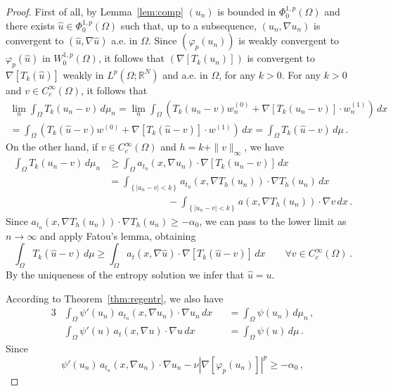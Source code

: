 \documentclass[twoside,reqno]{amsart}
\numberwithin{equation}{section}
\theoremstyle{definition}
\newcommand{\R}{\mathbb{R}}
\begin{document}
\begin{proof}
First of all, by Lemma~\ref{lem:comp} $(u_n)$ is
bounded in $\Phi^{1,p}_0(\Omega)$ and there exists 
$\hat{u}\in\Phi^{1,p}_0(\Omega)$ such that, 
up to a subsequence, $(u_n,\nabla u_n)$ is convergent to
$(\hat{u},\nabla\hat{u})$ a.e. in $\Omega$.
Since $(\varphi_p(u_n))$ is weakly convergent to
$\varphi_p(\hat{u})$ in $W^{1,p}_0(\Omega)$, it follows that
$(\nabla[T_k(u_n)])$ is convergent to $\nabla[T_k(\hat{u})]$ 
weakly in $L^p(\Omega;\R^N)$ and a.e. in $\Omega$, for any $k>0$.
For any $k>0$ and $v\in C^\infty_c(\Omega)$,  it follows that
\begin{multline*}
\lim_n \int_{\Omega} T_{k}(u_n-v) \,d\mu_n =
\lim_n \int_{\Omega} \left(T_{k}(u_n-v) w_n^{(0)}
+ \nabla [T_{k}(u_n-v)]\cdot w_n^{(1)}\right)\,dx \\
=
\int_{\Omega} \left(T_{k}(\hat{u}-v) w^{(0)}
+ \nabla [T_{k}(\hat{u}-v)]\cdot w^{(1)}\right)\,dx 
= \int_{\Omega} T_{k}(\hat{u}-v) \,d\mu\,.
\end{multline*}
On the other hand, if $v\in C^\infty_c(\Omega)$ 
and $h=k+\|v\|_\infty$, we have
\[
\begin{split}
\int_{\Omega} T_{k}(u_n-v)\,d\mu_n
&\geq
\int_{\Omega} a_{t_n}(x,\nabla u_n) \cdot 
\nabla \left[T_{k}(u_n-v)\right]\,dx\\
&=
\int_{\left\{|u_n-v|<k\right\}} 
a_{t_n}(x,\nabla T_h(u_n)) \cdot \nabla T_h(u_n)\,dx \\
&\qquad\qquad\qquad
- \int_{\left\{|u_n-v|<k\right\}} 
a(x,\nabla T_h(u_n)) \cdot \nabla v\,dx \,.
\end{split}
\]
Since 
$a_{t_n}(x,\nabla T_h(u_n)) \cdot \nabla T_h(u_n)
\geq -\alpha_0$, 
we can pass to the lower limit as $n\to\infty$ and
apply Fatou's lemma, obtaining
\[
\int_{\Omega} T_{k}(\hat{u}-v) \,d\mu
\geq
\int_{\Omega} a_{t}(x,\nabla \hat{u}) \cdot 
\nabla \left[T_{k}(\hat{u}-v)\right]\,dx
\qquad\forall v\in C^\infty_c(\Omega)\,.
\]
By the uniqueness of the entropy solution we infer
that $\hat{u}=u$.
\par
According to Theorem~\ref{thm:regentr}, we also have
\begin{alignat*}{3}
&\int_{\Omega} \psi'(u_n)\,a_{t_n}(x,\nabla u_n) \cdot 
\nabla u_n\,dx &&=
\int_{\Omega} \psi(u_n)\,d\mu_n\,,\\
&\int_{\Omega} \psi'(u)\,a_{t}(x,\nabla u) \cdot 
\nabla u\,dx &&=
\int_{\Omega} \psi(u) \,d\mu\,.
\end{alignat*}
Since
\[
\psi'(u_n)\,a_{t_n}(x,\nabla u_n) \cdot 
\nabla u_n - \nu |\nabla [\varphi_p(u_n)]|^p 
\geq - \alpha_0\,,
\]
\end{proof}
\end{document}
